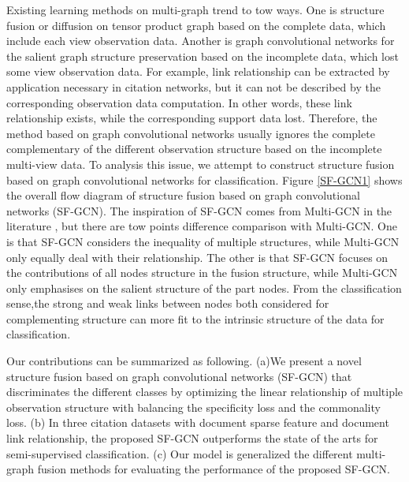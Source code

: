 \documentclass[review]{elsarticle}
\begin{document}
Existing learning methods on multi-graph trend to tow ways. One is structure fusion \cite{Lin20131286} \cite{Lin2014146}\cite{7268821}\cite{7301305}\cite{Lin20161}\cite{Lin2017275}\cite{Lin2017Dynamic}\cite{Lin2018structure} \cite{lin2018class}\cite{LINGF2018}\cite{lin2019transfer} or diffusion on tensor product graph\cite{yang2011affinity} \cite{yang2012affinity} \cite{bai2019automatic} \cite{li2019semi} \cite{bai2017regularized} \cite{bai2017ensemble} based on the complete data, which include each view observation data. Another is graph convolutional networks for the salient graph structure preservation \cite{khan2019multi} based on the incomplete data, which lost some view observation data. For example, link relationship can be extracted by application necessary in citation networks, but it can not be described by the corresponding observation data computation. In other words, these link relationship exists, while the corresponding support data lost. Therefore, the method based on graph convolutional networks usually ignores the complete complementary of the different observation structure based on the incomplete multi-view data. To analysis this issue, we attempt to construct structure fusion based on graph convolutional networks for classification. Figure \ref{SF-GCN1} shows the overall flow diagram of structure fusion based on graph convolutional networks (SF-GCN). The inspiration of SF-GCN comes from Multi-GCN in the literature \cite{khan2019multi}, but there are tow points difference comparison with Multi-GCN. One is that SF-GCN considers the inequality of multiple structures, while Multi-GCN only equally deal with their relationship. The other is that SF-GCN focuses on the contributions of all nodes structure in the fusion structure, while Multi-GCN only emphasises on the salient structure of the part nodes. From the classification sense,the strong and weak links between nodes both considered for complementing structure can  more fit to the intrinsic structure of the data for classification.

Our contributions can be summarized as following. (a)We present a novel structure fusion based on graph convolutional networks (SF-GCN) that discriminates the different classes by optimizing the linear relationship of multiple observation structure with balancing the specificity loss and the commonality loss. (b) In three citation datasets with document sparse feature and document link relationship, the proposed SF-GCN outperforms the state of the arts for semi-supervised classification. (c) Our model is generalized the different multi-graph fusion methods for evaluating the performance of the proposed SF-GCN.
\end{document}
